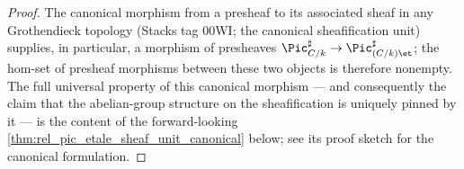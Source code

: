 \begin{proof}




\leanok
  The canonical morphism from a presheaf to its associated sheaf in
  any Grothendieck topology (Stacks tag 00WI; the canonical
  sheafification unit) supplies, in particular, a morphism of
  presheaves \(\Pic^\sharp_{C/k} \to \Pic^\sharp_{(C/k)\et}\); the
  hom-set of presheaf morphisms between these two objects is therefore
  nonempty. The full universal property of this canonical morphism
  --- and consequently the claim that the abelian-group structure on
  the sheafification is uniquely pinned by it --- is the content of
  the forward-looking \cref{thm:rel_pic_etale_sheaf_unit_canonical}
  below; see its proof sketch for the canonical formulation.
\end{proof}

